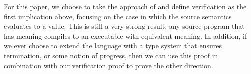 For this paper, we choose to take the approach of \cite{chlipala2007certified}
and define verification as the first implication above, focusing on the case in
which the source semantics evaluates to a value. This is still a very strong
result: any source program that has meaning compiles to an executable with
equivalent meaning. In addition, if we ever choose to extend the language with a
type system that ensures termination, or some notion of progress, then we can
use this proof in combination with our verification proof to prove the other
direction. 
